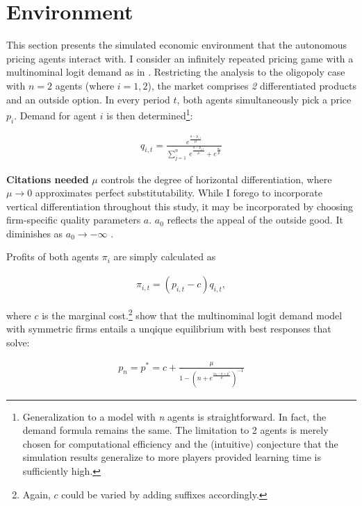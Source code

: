 \section{Environment}\label{enironment}

This section presents the simulated economic environment that the autonomous pricing agents interact with. I consider an infinitely repeated pricing game with a multinominal logit demand as in \textcite{calvano_artificial_2019}. Restricting the analysis to the oligopoly case with $n=2$ agents (where $i = 1,2$), the market comprises \emph{2} differentiated products and an outside option. In every period $t$, both agents simultaneously pick a price $p_i$. Demand for agent $i$ is then determined\footnote{Generalization to a model with \emph{n} agents is straightforward. In fact, the demand formula remains the same. The limitation to 2 agents is merely chosen for computational efficiency and the (intuitive) conjecture that the simulation results generalize to more players provided learning time is sufficiently high.}:

\begin{gather}\label{quantity}
q_{i,t}=\frac{e^{\frac{a - p_{i,t}}{\mu}}}{\sum_{j=1}^{n}~ e^{\frac{a-p_{j,t}}{\mu}}+e^{\frac{a_0}{\mu}}}
\end{gather}

\textbf{Citations needed}
$\mu$ controls the degree of horizontal differentiation, where $\mu \rightarrow 0$ approximates perfect substitutability. While I forego to incorporate vertical differentiation throughout this study, it may be incorporated by choosing firm-specific quality parameters $a$. $a_0$ reflects the appeal of the outside good. It diminishes as $a_0 \rightarrow -\infty$ \parencite{anderson_logit_1992}. 

Profits of both agents $\pi_i$ are simply calculated as

\begin{gather}\label{profit}
\pi_{i,t} = (p_{i,t} - c) q_{i,t},
\end{gather}

where $c$ is the marginal cost.\footnote{Again, $c$ could be varied by adding suffixes accordingly.} \textcite{anderson_logit_1992} show that the multinominal logit demand model with symmetric firms entails a unqique equilibrium with best responses that solve:

\begin{gather}\label{best_response}
	p_n = p^* = c + \frac{\mu}{1 - (n + e^{\frac{a_0 - a + p^*}{\mu}})^{-1}}
\end{gather}

